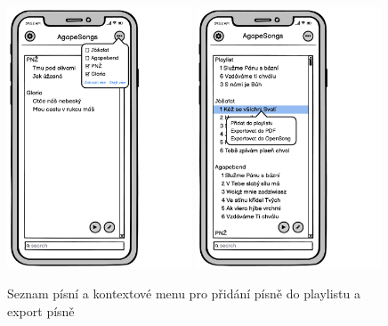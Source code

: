 
\begin{figure}
    \includegraphics[width=0.49\textwidth]{images/B-navrh-ui/B-2-seznam-pisni.pdf}
    \includegraphics[width=0.49\textwidth]{images/B-navrh-ui/B-2-seznam-pisni-kontextove-menu.pdf}
    \caption{Seznam písní a kontextové menu pro přidání písně do playlistu a export písně}
\end{figure}


